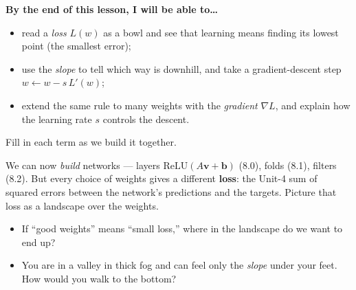 \documentclass[10pt]{article}
\newcommand{\vv}{\mathbf{v}}
\newcommand{\bb}{\mathbf{b}}
\newcommand{\relu}{\mathrm{ReLU}}
\begin{document}
\namedateperiod

\vspace{0.12in}

\begin{objectivebox}
\textbf{By the end of this lesson, I will be able to\dots}
\begin{itemize}\setlength{\itemsep}{2pt}
  \item read a \emph{loss} $L(w)$ as a bowl and see that learning means finding its lowest point (the smallest error);
  \item use the \emph{slope} to tell which way is downhill, and take a gradient-descent step $w\leftarrow w-s\,L'(w)$;
  \item extend the same rule to many weights with the \emph{gradient} $\nabla L$, and explain how the learning rate $s$ controls the descent.
\end{itemize}
\end{objectivebox}

\vspace{0.06in}

\begin{vocabbox}
\small
Fill in each term as we build it together.
\vspace{2pt}
\end{vocabbox}

\begin{hookbox}
We can now \emph{build} networks --- layers $\relu(A\vv+\bb)$ (8.0), folds (8.1), filters (8.2). But every choice
of weights gives a different \textbf{loss}: the Unit-4 sum of squared errors between the network's predictions
and the targets. Picture that loss as a landscape over the weights.
\begin{itemize}\setlength{\itemsep}{1pt}
  \item If ``good weights'' means ``small loss,'' where in the landscape do we want to end up? 
  \item You are in a valley in thick fog and can feel only the \emph{slope} under your feet. How would you walk to the bottom? 
\end{itemize}
\end{hookbox}
\end{document}
